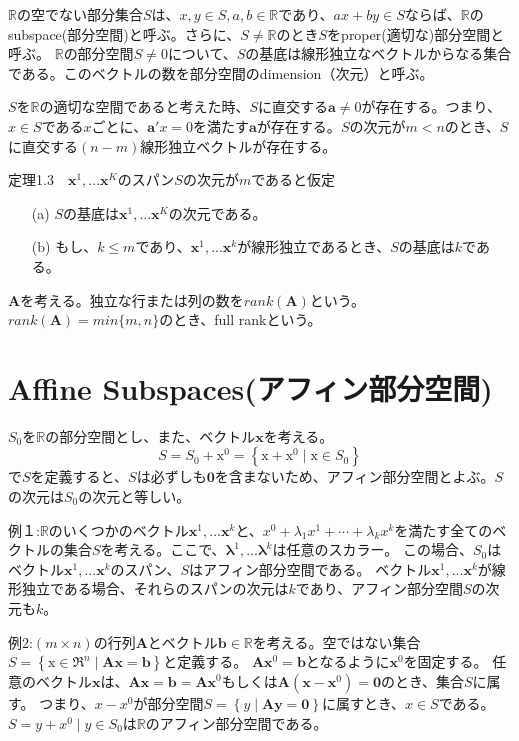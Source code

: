 \documentclass{jsarticle}
\begin{document}
$\mathbb{R}$の空でない部分集合$S$は、$x,y\in S,a,b\in \mathbb{R}$であり、$ax+by\in S$ならば、$\mathbb{R}$のsubspace(部分空間)と呼ぶ。さらに、$S\neq\mathbb{R}$のとき$S$をproper(適切な)部分空間と呼ぶ。
$\mathbb{R}$の部分空間$S\neq{0}$について、$S$の基底は線形独立なベクトルからなる集合である。このベクトルの数を部分空間のdimension（次元）と呼ぶ。

$S$を$\mathbb{R}$の適切な空間であると考えた時、$S$に直交する$\bm{a}\neq0$が存在する。つまり、$x\in S$である$x$ごとに、$\bm{a}'x=0$を満たす$\bm{a}$が存在する。$S$の次元が$m<n$のとき、$S$に直交する$(n-m)$線形独立ベクトルが存在する。

定理1.3　$\bm{x}^1,...\bm{x}^K$のスパン$S$の次元が$m$であると仮定
\begin{itemize}
\item[(a)] $S$の基底は$\bm{x}^1,...\bm{x}^K$の次元である。
\item[(b)] もし、$k\leq m$であり、$\bm{x}^1,...\bm{x}^k$が線形独立であるとき、$S$の基底は$k$である。
\end{itemize}

$\bm{A}$を考える。独立な行または列の数を$rank(\bm{A})$という。
$rank(\bm{A})=min\{m,n\}$のとき、full rankという。

\section*{Affine Subspaces(アフィン部分空間)}
$S_0$を$\mathbb{R}$の部分空間とし、また、ベクトル$\bm{x}$を考える。
\begin{equation}
S=S_{0}+\mathrm{x}^{0}=\left\{\mathrm{x}+\mathrm{x}^{0} \mid \mathrm{x} \in S_{0}\right\}
\end{equation}
で$S$を定義すると、$S$は必ずしも$\bm{0}$を含まないため、アフィン部分空間とよぶ。$S$の次元は$S_0$の次元と等しい。\par
例１:$\mathbb{R}$のいくつかのベクトル$\bm{x}^1,...\bm{x}^k$と、$x^{0}+\lambda_{1} x^{1}+\cdots+\lambda_{k} x^{k}$を満たす全てのベクトルの集合$S$を考える。ここで、$\bm{\lambda}^1,...\bm{\lambda}^k$は任意のスカラー。 
この場合、$S_0$はベクトル$\bm{x}^1,...\bm{x}^k$のスパン、$S$はアフィン部分空間である。 
ベクトル$\bm{x}^1,...\bm{x}^k$が線形独立である場合、それらのスパンの次元は$k$であり、アフィン部分空間$S$の次元も$k$。\par
例2:$(m\times n)$の行列$\bm{A}$とベクトル$\bm{b}\in \mathbb{R}$を考える。空ではない集合$S=\left\{\mathrm{x} \in \Re^{n} \mid \mathbf{A x}=\mathbf{b}\right\}$と定義する。
$\bm{A}\bm{x}^0=\bm{b}$となるように$\bm{x}^0$を固定する。
任意のベクトル$\bm{x}$は、$\bm{Ax}=\bm{b}=\bm{Ax}^0$もしくは$\bm{A}(\bm{x}-\bm{x}^0)=\bm{0}$のとき、集合$S$に属す。
つまり、$x-x^0$が部分空間$S=\left\{y \mid \mathbf{A y}=\mathbf{0}\right\}$に属すとき、$x\in S$である。
$S={y+x^0\mid y \in S_0}$は$\mathbb{R}$のアフィン部分空間である。
\end{document}
